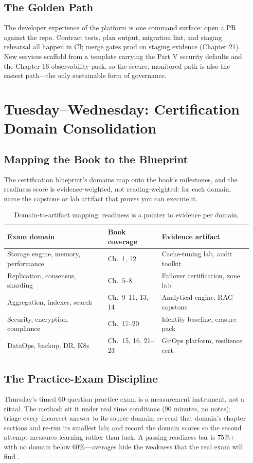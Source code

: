 \subsection{The Golden Path}
The developer experience of the platform is one command surface: open a PR against the repo. Contract tests, plan output, migration lint, and staging rehearsal all happen in CI; merge gates prod on staging evidence (Chapter 21). New services scaffold from a template carrying the Part V security defaults and the Chapter 16 observability pack, so the secure, monitored path is also the easiest path---the only sustainable form of governance.

\section{Tuesday--Wednesday: Certification Domain Consolidation}
\subsection{Mapping the Book to the Blueprint}
The certification blueprint's domains map onto the book's milestones, and the readiness score is evidence-weighted, not reading-weighted: for each domain, name the capstone or lab artifact that proves you can execute it.

\begin{table}[H]
\centering\footnotesize
\begin{tabular}{@{}p{5.4cm}p{4.2cm}p{3.6cm}@{}}
\toprule
\textbf{Exam domain} & \textbf{Book coverage} & \textbf{Evidence artifact} \\
\midrule
Storage engine, memory, performance & Ch.\ 1, 12 & Cache-tuning lab, audit toolkit \\
Replication, consensus, sharding & Ch.\ 5--8 & Failover certification, zone lab \\
Aggregation, indexes, search & Ch.\ 9--11, 13, 14 & Analytical engine, RAG capstone \\
Security, encryption, compliance & Ch.\ 17--20 & Identity baseline, erasure pack \\
DataOps, backup, DR, K8s & Ch.\ 15, 16, 21--23 & GitOps platform, resilience cert. \\
\bottomrule
\end{tabular}
\caption{Domain-to-artifact mapping: readiness is a pointer to evidence per domain.}
\label{tab:ch24-domains}
\end{table}

\subsection{The Practice-Exam Discipline}
Thursday's timed 60-question practice exam is a measurement instrument, not a ritual. The method: sit it under real time conditions (90 minutes, no notes); triage every incorrect answer to its source domain; re-read that domain's chapter sections and re-run its smallest lab; and record the domain scores so the second attempt measures learning rather than luck. A passing readiness bar is 75\%+ with no domain below 60\%---averages hide the weakness that the real exam will find \cite{mongodbUniversityDocs}.

